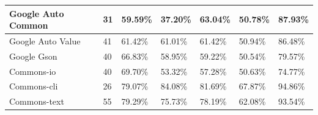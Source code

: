 \documentclass[../../main]{subfiles}
\begin{document}
\begin{table}[!htb]
\begin{tabular}{|l|l|l|l|l|l|l|}
Google Auto   Common  & 31                   & 59.59\%                           & 37.20\%                                                & 63.04\%                            & 50.78\%                                                                                                                                    & 87.93\%                                                                                                                                    \\ \hline
Google Auto   Value   & 41                   & 61.42\%                           & 61.01\%                                                & 61.42\%                            & 50.94\%                                                                                                                                    & 86.48\%                                                                                                                                    \\ \hline
Google Gson           & 40                   & 66.83\%                           & 58.95\%                                                & 59.22\%                            & 50.54\%                                                                                                                                    & 79.57\%                                                                                                                                    \\ \hline
Commons-io            & 40                   & 69.70\%                           & 53.32\%                                                & 57.28\%                            & 50.63\%                                                                                                                                    & 74.77\%                                                                                                                                    \\ \hline
Commons-cli           & 26                   & 79.07\%                           & 84.08\%                                                & 81.69\%                            & 67.87\%                                                                                                                                    & 94.86\%                                                                                                                                    \\ \hline
Commons-text          & 55                   & 79.29\%                           & 75.73\%                                                & 78.19\%                            & 62.08\%                                                                                                                                    & 93.54\%                                                                                                                                    \\ \hline

\end{tabular}
\end{table}
\end{document}
